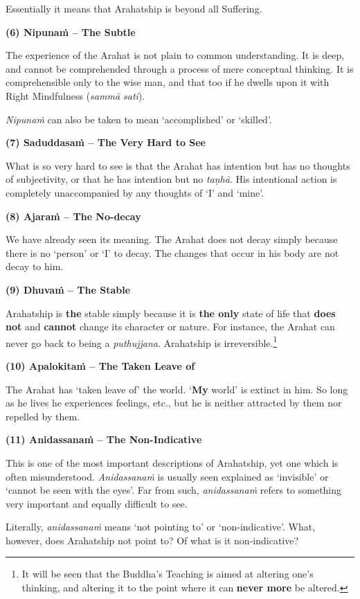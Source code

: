 \protect\hypertarget{beyond}{}{}Essentially it means that Arahatship is beyond all Suffering.

\textbf{(6) Nipunaṁ -- The Subtle}

The experience of the Arahat is not plain to common understanding. It is deep, and cannot be comprehended through a process of mere conceptual thinking. It is comprehensible only to the wise man, and that too if he dwells upon it with Right Mindfulness (\emph{sammā sati}).

\emph{Nipunaṁ} can also be taken to mean `accomplished' or `skilled'.

\textbf{(7) Saduddasaṁ -- The Very Hard to See}

What is so very hard to see is that the Arahat has intention but has no thoughts of subjectivity, or that he has intention but no \emph{taṇhā}. His intentional action is completely unaccompanied by any thoughts of `I' and `mine'.

\textbf{(8) Ajaraṁ -- The No-decay}

We have already seen its meaning. The Arahat does not decay simply because there is no `person' or `I' to decay. The changes that occur in his body are not decay to him.

\textbf{(9) Dhuvaṁ -- The Stable}

Arahatship is \textbf{the} stable simply because it is \textbf{the only} state of life that \textbf{does not} and \textbf{cannot} change its character or nature. For instance, the Arahat can never go back to being a \emph{puthujjana}. Arahatship is irreversible.\footnote{It will be seen that the Buddha's Teaching is aimed at altering one's thinking, and altering it to the point where it can \textbf{never more} be altered.}

\textbf{(10) Apalokitaṁ -- The Taken Leave of}

The Arahat has `taken leave of' the world. `\textbf{My} world' is extinct in him. So long as he lives he experiences feelings, etc., but he is neither attracted by them nor repelled by them.

\textbf{(11) Anidassanaṁ -- The Non-Indicative}

This is one of the most important descriptions of Arahatship, yet one which is often misunderstood. \emph{Anidassanaṁ} is usually seen explained as `invisible' or `cannot be seen with the eyes'. Far from such, \emph{anidassanaṁ} refers to something very important and equally difficult to see.

Literally, \emph{anidassanaṁ} means `not pointing to' or `non-indicative'. What, however, does Arahatship not point to? Of what is it non-indicative?

